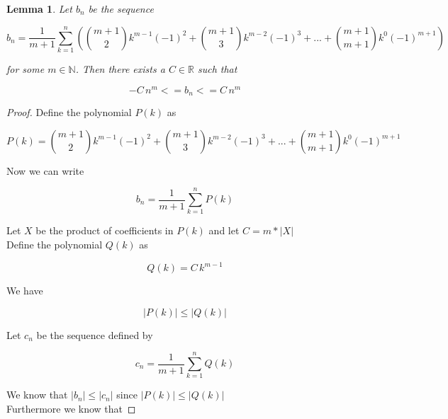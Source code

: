 \documentclass{article}
\newtheorem{lemma}{Lemma}
\begin{document}
\begin{lemma}
Let $b_{n}$ be the sequence 

\begin{equation*}
b_{n} = \frac{1}{m+1} \displaystyle \sum_{k=1}^{n} \left( \binom{m+1}{2} k^{m-1} (-1)^2 +  \binom{m+1}{3} k^{m-2} (-1)^3 + ... +  \binom{m+1}{m+1} k^{0} (-1)^{m+1} \right) 
\end{equation*}

for some $m \in \mathbb{N}$. Then there exists a $C \in \mathbb{R}$ such that

\begin{equation*}
-C \, n^{m} <= b_{n} <= C \, n^{m}
\end{equation*}

\end{lemma}

\begin{proof}
Define the polynomial $P(k)$ as 

\begin{equation*}
P(k) = \binom{m+1}{2} k^{m-1} (-1)^2 +  \binom{m+1}{3} k^{m-2} (-1)^3 + ... +  \binom{m+1}{m+1} k^{0} (-1)^{m+1}
\end{equation*}

Now we can write 

\begin{equation*}
b_{n} = \frac{1}{m+1} \displaystyle \sum_{k=1}^{n} P(k)
\end{equation*}

Let $X$ be the product of coefficients in $P(k)$ and let $C = m * |X|$ \\

Define the polynomial $Q(k)$ as

\begin{equation*}
Q(k) = C \, k^{m-1}
\end{equation*}

We have

\begin{equation*}
|P(k)| \le |Q(k)|
\end{equation*}

Let $c_{n}$ be the sequence defined by

\begin{equation*}
c_{n} = \frac{1}{m+1} \displaystyle \sum_{k=1}^{n} Q(k)
\end{equation*}

We know that $|b_{n}| \le |c_{n}|$ since $|P(k)| \le |Q(k)|$ \\

Furthermore we know that


\end{proof}
\end{document}
